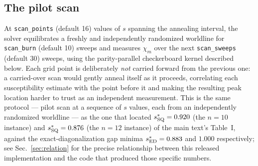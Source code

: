 \documentclass[11pt]{article}
\newcommand{\chim}{\chi_{m}}
\begin{document}
\subsection{The pilot scan}
At \texttt{scan\_points} (default 16) values of $s$ spanning the annealing interval, the solver
equilibrates a freshly and independently randomized worldline for \texttt{scan\_burn} (default
10) sweeps and measures $\chim$ over the next \texttt{scan\_sweeps} (default 30) sweeps, using the
parity-parallel checkerboard kernel described below. Each grid point is deliberately \emph{not}
carried forward from the previous one: a carried-over scan would gently anneal itself as it
proceeds, correlating each susceptibility estimate with the point before it and making the
resulting peak location harder to trust as an independent measurement. This is the same protocol
--- pilot scan at a sequence of $s$ values, each from an independently randomized worldline --- as
the one that located $s^*_{\rm SQ}=0.920$ (the $n=10$ instance) and $s^*_{\rm SQ}=0.876$ (the
$n=12$ instance) of the main text's Table~I, against the exact-diagonalization gap minima
$s^*_{\rm ED}=0.883$ and $1.000$ respectively; see Sec.~\ref{sec:relation} for the precise
relationship between this released implementation and the code that produced those specific
numbers.
\end{document}
